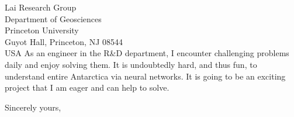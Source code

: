 \documentclass[12pt]{letter} %
\begin{document}
\begin{letter}{
Lai Research Group\\
Department of Geosciences\\
Princeton University\\
Guyot Hall, Princeton, NJ 08544\\
USA
}
As an engineer in the R\&D department, I encounter challenging problems daily and enjoy solving them.
It is undoubtedly hard, and thus fun, to understand entire Antarctica via neural networks.
It is going to be an exciting project that I am eager and can help to solve.\\

\closing{Sincerely yours,}


\end{letter}
\end{document}
